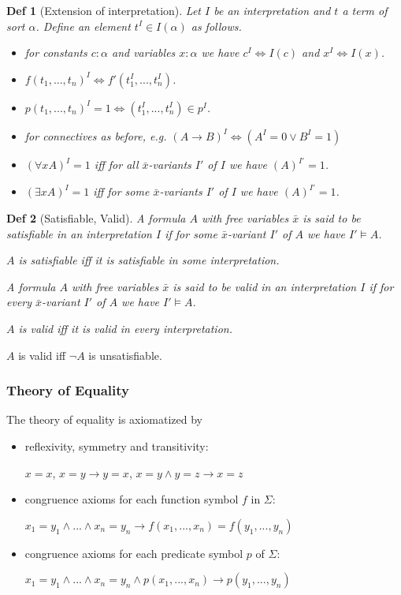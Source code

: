 \documentclass[]{article}
\newtheorem*{definition*}{Def}
\begin{document}
\begin{definition*}[Extension of interpretation]
	Let $I$ be an interpretation and $t$ a term of sort $\alpha$. Define an element $t^I \in I(\alpha)$ as follows.
	\begin{itemize}
		\item for constants $c: \alpha$ and variables $x: \alpha$ we have $c^I \iff I(c)$ and $x^I \iff I(x)$.
		\item $f(t_1,...,t_n)^I \iff f'(t_1^I,...,t_n^I)$.
		\item $p(t_1,...,t_n)^I = 1 \iff (t_1^I,...,t_n^I) \in p^I$.
		\item for connectives as before, e.g. $(A\rightarrow B)^I \iff (A^I = 0 \lor B^I = 1)$
		\item $(\forall x A)^I = 1$ iff for all $\bar{x}$-variants $I'$ of $I$ we have $(A)^{I'} = 1$.
		\item $(\exists x A)^I = 1$ iff for some $\bar{x}$-variants $I'$ of $I$ we have $(A)^{I'} = 1$.
	\end{itemize}
\end{definition*}

\begin{definition*}[Satisfiable, Valid]
	A formula $A$ with free variables $\bar{x}$ is said to be satisfiable in an interpretation $I$ if for some $\bar{x}$-variant $I'$ of $A$ we have $I' \models A$.
	
	$A$ is satisfiable iff it is satisfiable in some interpretation.
	
	A formula $A$ with free variables $\bar{x}$ is said to be valid in an interpretation $I$ if for every $\bar{x}$-variant $I'$ of $A$ we have $I' \models A$.
	
	$A$ is valid iff it is valid in every interpretation.
\end{definition*}

$A$ is valid iff $\lnot A$ is unsatisfiable.

\subsubsection{Theory of Equality}

The theory of equality is axiomatized by
\begin{itemize}
	\item reflexivity, symmetry and transitivity:
	
	$x = x$, $x = y \rightarrow y = x$, $x = y \land y = z \rightarrow x = z$
	
	\item congruence axioms for each function symbol $f$ in $\Sigma$:
	
	$x_1 = y_1 \land ... \land x_n = y_n \rightarrow f(x_1, ..., x_n) = f(y_1, ..., y_n)$
	
	\item congruence axioms for each predicate symbol $p$ of $\Sigma$:
	
	$x_1 = y_1 \land ... \land x_n = y_n \land p(x_1, ..., x_n) \rightarrow p(y_1, ..., y_n)$
\end{itemize}
\end{document}
